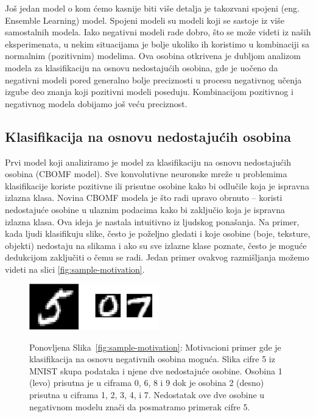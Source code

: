 Još jedan model o kom ćemo kasnije biti više detalja je takozvani spojeni (eng. Ensemble Learning) model. Spojeni modeli su modeli koji se sastoje iz više samostalnih modela. Iako negativni modeli rade dobro, što se može videti iz naših eksperimenata, u nekim situacijama je bolje ukoliko ih koristimo u kombinaciji sa normalnim (pozitivnim) modelima. \cite{milosevic2020synergy} Ova osobina otkrivena je dubljom analizom modela za klasifikaciju na osnovu nedostajućih osobina, gde je uočeno da negativni modeli pored generalno bolje preciznosti u procesu negativnog učenja izgube deo znanja koji pozitivni modeli poseduju. Kombinacijom pozitivnog i negativnog modela dobijamo još veću preciznost.

\subsection*{Klasifikacija na osnovu nedostajućih osobina}

Prvi model koji analiziramo je model za klasifikaciju na osnovu nedostajućih osobina (CBOMF model). \cite{milovsevic2019classification} Sve konvolutivne neuronske mreže u problemima klasifikacije koriste pozitivne ili prisutne osobine kako bi odlučile koja je ispravna izlazna klasa. Novina CBOMF modela je što radi upravo obrnuto -- koristi nedostajuće osobine u ulaznim podacima kako bi zaključio koja je ispravna izlazna klasa. Ova ideja je nastala intuitivno iz ljudskog ponašanja. Na primer, kada ljudi klasifikuju slike, često je poželjno gledati i koje osobine (boje, teksture, objekti) nedostaju na slikama i ako su sve izlazne klase poznate, često je moguće dedukcijom zaključiti o čemu se radi. Jedan primer ovakvog razmišljanja možemo videti na slici \ref{fig:sample-motivation}. 

\begin{figure}[htp]
\centering
\includegraphics[height=2cm]{figures/motivation.pdf}

{Ponovljena Slika~\ref{fig:sample-motivation}: Motivacioni primer gde je klasifikacija na osnovu negativnih osobina moguća. Slika cifre 5 iz MNIST skupa podataka i njene dve nedostajuće osobine. Osobina 1 (levo) prisutna je u ciframa 0, 6, 8 i 9 dok je osobina 2 (desno) prisutna u ciframa 1, 2, 3, 4, i 7. Nedostatak ove dve osobine u negativnom modelu znači da posmatramo primerak cifre 5.} 
\end{figure}

